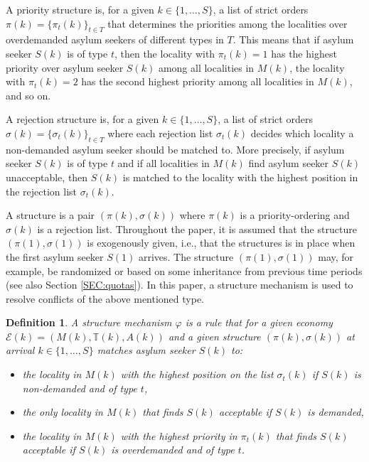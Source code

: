 \documentclass[12pt,fleqn]{article}
\newtheorem{definition}{Definition}
\begin{document}
A priority structure is, for a given $k\in\{1,\ldots,S\}$, a list of strict orders $\pi(k)=\{\pi_t(k)\}_{t\in T}$ that determines the priorities among the localities over overdemanded asylum seekers of different types in $T$. This means that if asylum seeker $S(k)$ is of type $t$, then the locality with $\pi_t(k)=1$ has the highest priority over asylum seeker $S(k)$ among all localities in $M(k)$, the locality with $\pi_t(k)=2$ has the second highest priority among all localities in $M(k)$, and so on.

A rejection structure is, for a given $k\in\{1,\ldots,S\}$, a list of strict orders $\sigma(k)=\{\sigma_t(k)\}_{t\in T}$ where each rejection list $\sigma_t(k)$ decides which locality a non-demanded asylum seeker should be matched to. More precisely, if asylum seeker $S(k)$ is of type $t$ and if all localities in $M(k)$ find asylum seeker $S(k)$ unacceptable, then $S(k)$ is matched to the locality with the highest position in the rejection list $\sigma_t(k)$.

A structure is a pair $(\pi(k),\sigma(k))$ where $\pi(k)$ is a priority-ordering and $\sigma(k)$ is a rejection list. Throughout the paper, it is assumed that the structure $(\pi(1),\sigma(1))$ is exogenously given, i.e., that the structures is in place when the first asylum seeker $S(1)$ arrives. The structure $(\pi(1),\sigma(1))$ may, for example, be randomized or based on some inheritance from previous time periods (see also Section \ref{SEC:quotas}). In this paper, a structure mechanism is used to resolve conflicts of the above mentioned type.
\begin{definition}\rm\label{DEF:Structure_Mechanism}
A structure mechanism $\varphi$ is a rule that for a given economy $\mathcal{E}(k)=(M(k),\mathbb{T}(k),A(k))$ and a given structure $(\pi(k),\sigma(k))$ at arrival $k\in\{1,\ldots,S\}$ matches asylum seeker $S(k)$ to:
\begin{itemize}
\item[(i)] the locality in $M(k)$ with the highest position on the list $\sigma_t(k)$ if $S(k)$ is non-demanded and of type $t$,
\item[(ii)] the only locality in $M(k)$ that finds $S(k)$ acceptable if $S(k)$ is demanded,
\item[(iii)] the locality in $M(k)$ with the highest priority in $\pi_t(k)$ that finds $S(k)$ acceptable if $S(k)$ is overdemanded and of type $t$.
\end{itemize}
\end{definition}
\end{document}
